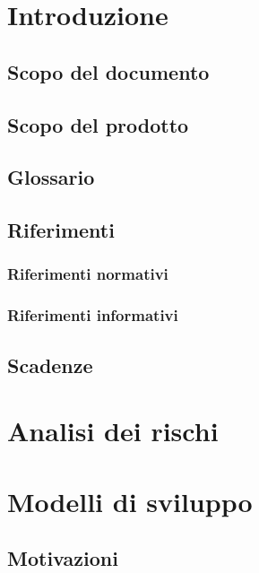 \documentclass[a4paper, oneside, openany, dvipsnames, table]{article}
\begin{document}
\copertina{}


\newpage
\tableofcontents
\newpage

\section{Introduzione}
	\subsection{Scopo del documento}
		
	\subsection{Scopo del prodotto}
		
	\subsection{Glossario}
		
	\subsection{Riferimenti}
		\subsubsection{Riferimenti normativi}
			
		\subsubsection{Riferimenti informativi}
			
	\subsection{Scadenze}
		
\newpage
\section{Analisi dei rischi}
	
	
\newpage
\section{Modelli di sviluppo}
	
	\subsection{Motivazioni}
		
\newpage
\end{document}
